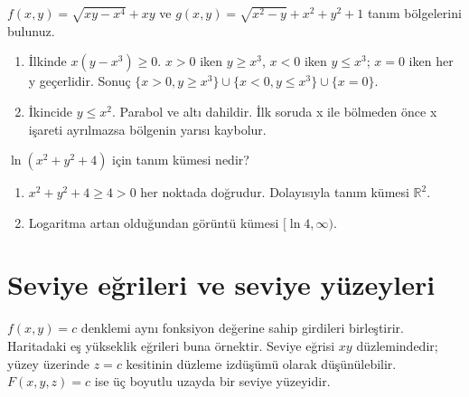 \begin{tcolorbox}[title={Örnek 4.3 | İşaret ayırımı gerektiren kök},colframe=accent]\(f(x,y)=\sqrt{xy-x^4}+xy\) ve \(g(x,y)=\sqrt{x^2-y}+x^2+y^2+1\) tanım bölgelerini bulunuz.
\par{}\end{tcolorbox}
\begin{tcolorbox}[title={Adım adım çözüm},colback=green!3!white,colframe=green]\begin{enumerate}
\item İlkinde \(x(y-x^3)\ge0\). \(x>0\) iken \(y\ge x^3\), \(x<0\) iken \(y\le x^3\); \(x=0\) iken her y geçerlidir. Sonuç \(\{x>0,y\ge x^3\}\cup\{x<0,y\le x^3\}\cup\{x=0\}\).
\item İkincide \(y\le x^2\). Parabol ve altı dahildir. İlk soruda x ile bölmeden önce x işareti ayrılmazsa bölgenin yarısı kaybolur.
\end{enumerate}\end{tcolorbox}
\begin{tcolorbox}[title={Örnek 4.4 | Her yerde tanımlı logaritma},colframe=accent]\(\ln(x^2+y^2+4)\) için tanım kümesi nedir?
\par{}\end{tcolorbox}
\begin{tcolorbox}[title={Adım adım çözüm},colback=green!3!white,colframe=green]\begin{enumerate}
\item \(x^2+y^2+4\ge4>0\) her noktada doğrudur. Dolayısıyla tanım kümesi \(\mathbb R^2\).
\item Logaritma artan olduğundan görüntü kümesi \([\ln4,\infty)\).
\end{enumerate}\end{tcolorbox}
\section{Seviye eğrileri ve seviye yüzeyleri}
\(f(x,y)=c\) denklemi aynı fonksiyon değerine sahip girdileri birleştirir. Haritadaki eş yükseklik eğrileri buna örnektir. Seviye eğrisi \(xy\) düzlemindedir; yüzey üzerinde \(z=c\) kesitinin düzleme izdüşümü olarak düşünülebilir. \(F(x,y,z)=c\) ise üç boyutlu uzayda bir seviye yüzeyidir.

